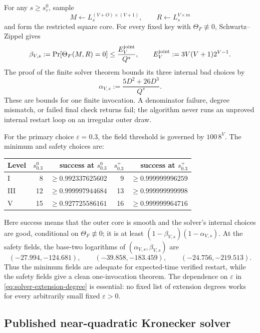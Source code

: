 \documentclass[11pt,a4paper]{article}
\theoremstyle{definition}
\theoremstyle{remark}
\begin{document}
For any $s\ge s_\varepsilon^0$, sample
\[
 M\leftarrow L_s^{(V+O)\times(V+1)},
 \qquad
 R\leftarrow L_s^{V\times m}
\]
and form the restricted square core.  For every fixed key with $\Theta_F\not\equiv0$, Schwartz--Zippel gives
\begin{equation}\label{eq:fast-beta}
 \beta_{V,s}:=\Pr[\Theta_F(M,R)=0]
 \le \frac{E_V^{\rm joint}}{Q^s},
 \qquad
 E_V^{\rm joint}:=3V(V+1)2^{V-1}.
\end{equation}
The proof of the finite solver theorem bounds its three internal bad choices by
\begin{equation}\label{eq:fast-alpha}
 \alpha_{V,s}:=\frac{5D^2+26D^3}{Q^s}.
\end{equation}
These are bounds for one finite invocation.  A denominator failure, degree mismatch, or failed final check returns \textsf{fail}; the algorithm never runs an unproved internal restart loop on an irregular outer draw.

For the primary choice $\varepsilon=0.3$, the field threshold is governed by $100\,8^V$.  The minimum and safety choices are:
\begin{center}
\small
\begin{tabular}{@{}lrrrr@{}}
\toprule
Level & $s_{0.3}^0$ & success at $s_{0.3}^0$ & $s_{0.3}^+$ & success at $s_{0.3}^+$ \\
\midrule
I   &8  &$\ge0.992337625602$ &9  &$\ge0.999999996259$\\
III &12 &$\ge0.999997944684$ &13 &$\ge0.999999999998$\\
V   &15 &$\ge0.927725586161$ &16 &$\ge0.999999964716$\\
\bottomrule
\end{tabular}
\end{center}
Here success means that the outer core is smooth and the solver's internal choices are good, conditional on $\Theta_F\not\equiv0$; it is at least
$(1-\beta_{V,s})(1-\alpha_{V,s})$.  At the safety fields, the base-two logarithms of $(\alpha_{V,s},\beta_{V,s})$ are
\[
(-27.994,-124.681),\qquad
(-39.858,-183.459),\qquad
(-24.756,-219.513).
\]
Thus the minimum fields are adequate for expected-time verified restart, while the safety fields give a clean one-invocation theorem.  The dependence on $\varepsilon$ in \eqref{eq:solver-extension-degree} is essential: no fixed list of extension degrees works for every arbitrarily small fixed $\varepsilon>0$.

\subsection{Published near-quadratic Kronecker solver}\label{subsec:solver}
\end{document}
